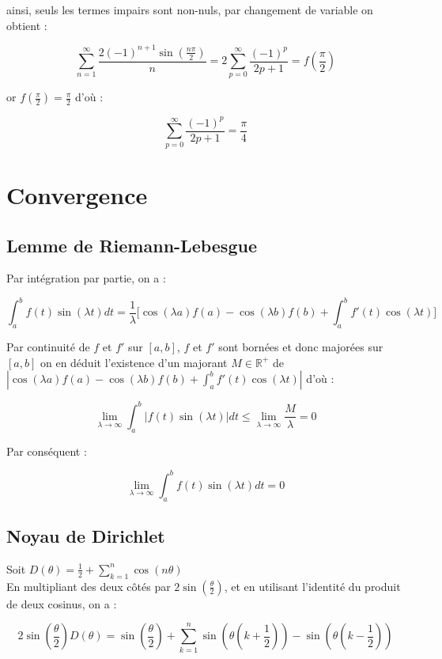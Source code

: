 \documentclass{article}
\begin{document}
ainsi, seuls les termes impairs sont non-nuls, par changement de variable on obtient :

$$\sum_{n = 1}^{\infty}{\frac{2 (-1)^{n + 1}\sin(\frac{n\pi}{2})}{n}} = 2 \sum_{p = 0}^{\infty}{\frac{(-1)^p}{2p+1}}
= f(\frac{\pi}{2})$$

or $f(\frac{\pi}{2}) = \frac{\pi}{2}$ d'où :

$$\sum_{p = 0}^{\infty}{\frac{(-1)^p}{2p+1}} = \frac{\pi}{4}$$

\section{Convergence}

\subsection{Lemme de Riemann-Lebesgue}

Par intégration par partie, on a : 

$$\int_{a}^{b}{f(t) \sin(\lambda t) dt} = \frac{1}{\lambda}\Big[ \cos(\lambda a) f(a) - \cos(\lambda b)
f(b) + \int_{a}^{b}{f'(t) \cos(\lambda t)} \Big]$$

Par continuité de $f$ et $f'$ sur $[a, b]$, $f$ et $f'$ sont bornées et donc majorées sur $[a, b]$
on en déduit l'existence d'un majorant $M \in \mathbb{R}^{+}$ de 
$|\cos(\lambda a) f(a) - \cos(\lambda b) f(b) + \int_{a}^{b}{f'(t) \cos(\lambda t)}|$ d'où :

$$\lim_{\lambda \to \infty} \int_{a}^{b}{|f(t) \sin(\lambda t)| dt} \leq 
\lim_{\lambda \to \infty} \frac{M}{\lambda} = 0$$

Par conséquent : 

$$\lim_{\lambda \to \infty} \int_{a}^{b}{f(t) \sin(\lambda t) dt} = 0$$

\subsection{Noyau de Dirichlet}

    Soit $D(\theta) = \frac{1}{2} + \sum_{k = 1}^{n} \cos(n \theta)$ \\

    En multipliant des deux côtés par $2\sin(\frac{\theta}{2})$, et en utilisant l'identité du produit 
    de deux cosinus, on a :

    $$2\sin(\frac{\theta}{2}) D(\theta) = \sin(\frac{\theta}{2}) + \sum_{k = 1}^{n} 
    \sin(\theta (k + \frac{1}{2})) - \sin(\theta (k - \frac{1}{2}))$$
\end{document}
